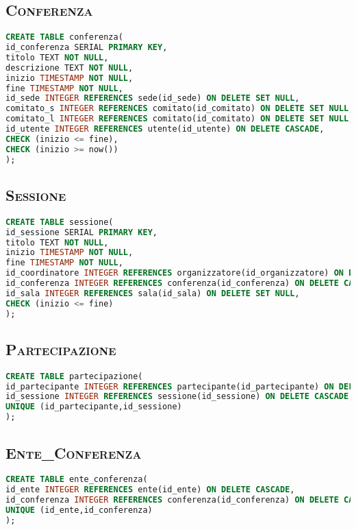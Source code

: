 \subsection{\textsc{Conferenza}}
\begin{lstlisting}[language=SQL,style=mystyle, caption={Tabella: Conferenza}]
CREATE TABLE conferenza(
id_conferenza SERIAL PRIMARY KEY,
titolo TEXT NOT NULL,
descrizione TEXT NOT NULL,
inizio TIMESTAMP NOT NULL,
fine TIMESTAMP NOT NULL,
id_sede INTEGER REFERENCES sede(id_sede) ON DELETE SET NULL,
comitato_s INTEGER REFERENCES comitato(id_comitato) ON DELETE SET NULL,
comitato_l INTEGER REFERENCES comitato(id_comitato) ON DELETE SET NULL,
id_utente INTEGER REFERENCES utente(id_utente) ON DELETE CASCADE,
CHECK (inizio <= fine), 
CHECK (inizio >= now()) 
);
\end{lstlisting}
\subsection{\textsc{Sessione}}
\begin{lstlisting}[language=SQL,style=mystyle, caption={Tabella: Sessione}]
CREATE TABLE sessione(
id_sessione SERIAL PRIMARY KEY,
titolo TEXT NOT NULL,
inizio TIMESTAMP NOT NULL,
fine TIMESTAMP NOT NULL,
id_coordinatore INTEGER REFERENCES organizzatore(id_organizzatore) ON DELETE SET NULL,
id_conferenza INTEGER REFERENCES conferenza(id_conferenza) ON DELETE CASCADE,
id_sala INTEGER REFERENCES sala(id_sala) ON DELETE SET NULL,
CHECK (inizio <= fine)
);
\end{lstlisting}
\subsection{\textsc{Partecipazione}}
\begin{lstlisting}[language=SQL,style=mystyle, caption={Tabella: Partecipazione}]
CREATE TABLE partecipazione(
id_partecipante INTEGER REFERENCES partecipante(id_partecipante) ON DELETE CASCADE,
id_sessione INTEGER REFERENCES sessione(id_sessione) ON DELETE CASCADE,
UNIQUE (id_partecipante,id_sessione) 
);
\end{lstlisting}
\subsection{\textsc{Ente\_Conferenza}}
\begin{lstlisting}[language=SQL,style=mystyle, caption={Tabella: Ente\_Conferenza}]
CREATE TABLE ente_conferenza(
id_ente INTEGER REFERENCES ente(id_ente) ON DELETE CASCADE,
id_conferenza INTEGER REFERENCES conferenza(id_conferenza) ON DELETE CASCADE,
UNIQUE (id_ente,id_conferenza)
);
\end{lstlisting}
